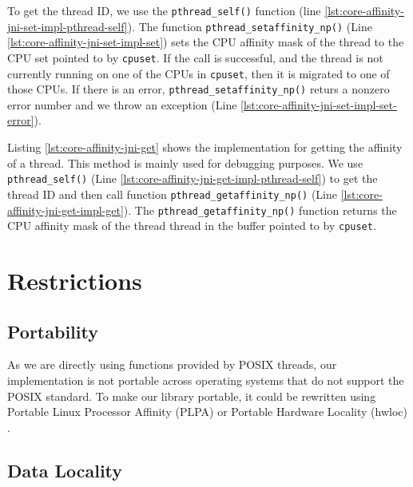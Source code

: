 To get the thread ID, we use the \lstinline!pthread_self()! function
(line \ref{lst:core-affinity-jni-set-impl-pthread-self}). The function
\lstinline!pthread_setaffinity_np()! (Line
\ref{lst:core-affinity-jni-set-impl-set}) sets the CPU affinity mask
of the thread to the CPU set pointed to by \lstinline!cpuset!.  If the
call is successful, and the thread is not currently running on one of
the CPUs in \lstinline!cpuset!, then it is migrated to one of those
CPUs. If there is an error, \lstinline!pthread_setaffinity_np()!
returs a nonzero error number and we throw an exception (Line
\ref{lst:core-affinity-jni-set-impl-set-error}).

Listing \ref{lst:core-affinity-jni-get} shows the implementation for
getting the affinity of a thread. This method is mainly used for
debugging purposes. We use \lstinline!pthread_self()! (Line
\ref{lst:core-affinity-jni-get-impl-pthread-self}) to get the thread
ID and then call function \lstinline!pthread_getaffinity_np()!  (Line
\ref{lst:core-affinity-jni-get-impl-get}). The
\lstinline!pthread_getaffinity_np()! function returns the CPU affinity
mask of the thread thread in the buffer pointed to by
\lstinline!cpuset!.




\section{Restrictions}
\label{sec:appendix-core-affinity-restrictions}

\subsection{Portability}

As we are directly using functions provided by POSIX threads, our
implementation is not portable across operating systems that do not
support the POSIX standard. To make our library portable, it could be
rewritten using Portable Linux Processor Affinity (PLPA)
\cite{OpenMPI2010a} or Portable Hardware Locality (hwloc)
\cite{OpenMPI2010}.

\subsection{Data Locality}

